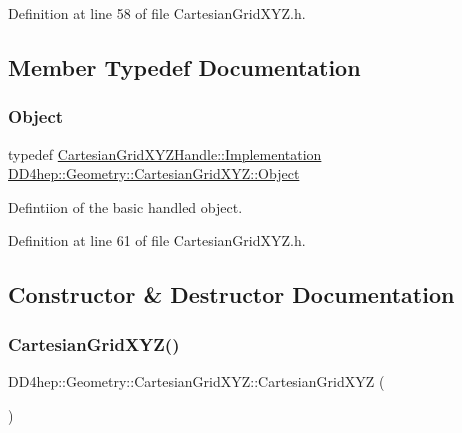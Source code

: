 Definition at line 58 of file Cartesian\+Grid\+X\+Y\+Z.\+h.



\subsection{Member Typedef Documentation}
\hypertarget{class_d_d4hep_1_1_geometry_1_1_cartesian_grid_x_y_z_a14399d469a4ddf78e0df3e14276a3e4e}{}\label{class_d_d4hep_1_1_geometry_1_1_cartesian_grid_x_y_z_a14399d469a4ddf78e0df3e14276a3e4e} 
\subsubsection{\texorpdfstring{Object}{Object}}
{\footnotesize\ttfamily typedef \hyperlink{class_d_d4hep_1_1_handle_ad7ff728a25806079516b8965b9113f1a}{Cartesian\+Grid\+X\+Y\+Z\+Handle\+::\+Implementation} \hyperlink{class_d_d4hep_1_1_geometry_1_1_cartesian_grid_x_y_z_a14399d469a4ddf78e0df3e14276a3e4e}{D\+D4hep\+::\+Geometry\+::\+Cartesian\+Grid\+X\+Y\+Z\+::\+Object}}



Defintiion of the basic handled object. 



Definition at line 61 of file Cartesian\+Grid\+X\+Y\+Z.\+h.



\subsection{Constructor \& Destructor Documentation}
\hypertarget{class_d_d4hep_1_1_geometry_1_1_cartesian_grid_x_y_z_a84fc0950667c6d509b733dc2a7f2160a}{}\label{class_d_d4hep_1_1_geometry_1_1_cartesian_grid_x_y_z_a84fc0950667c6d509b733dc2a7f2160a} 
\subsubsection{\texorpdfstring{Cartesian\+Grid\+X\+Y\+Z()}{CartesianGridXYZ()}\hspace{0.1cm}{\footnotesize\ttfamily [1/5]}}
{\footnotesize\ttfamily D\+D4hep\+::\+Geometry\+::\+Cartesian\+Grid\+X\+Y\+Z\+::\+Cartesian\+Grid\+X\+YZ (\begin{DoxyParamCaption}{ }\end{DoxyParamCaption})\hspace{0.3cm}{\ttfamily [default]}}



